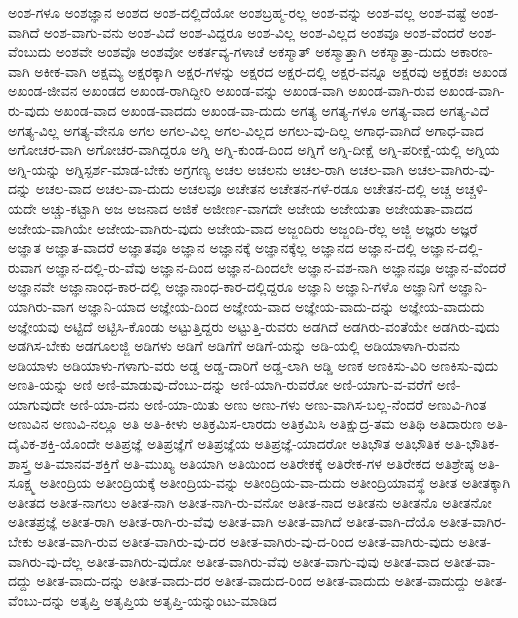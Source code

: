 {ಅಂಶ-ಗಳೂ
ಅಂಶಜ್ಞಾನ
ಅಂಶದ
ಅಂಶ-ದಲ್ಲಿದೆಯೋ
ಅಂಶಬ್ರಹ್ಮ-ರಲ್ಲ
ಅಂಶ-ವನ್ನು
ಅಂಶ-ವಲ್ಲ
ಅಂಶ-ವಷ್ಟೆ
ಅಂಶ-ವಾಗಿದೆ
ಅಂಶ-ವಾಗು-ವನು
ಅಂಶ-ವಿದೆ
ಅಂಶ-ವಿದ್ದರೂ
ಅಂಶ-ವಿಲ್ಲ
ಅಂಶ-ವಿಲ್ಲದ
ಅಂಶವೂ
ಅಂಶ-ವೆಂದರೆ
ಅಂಶ-ವೆಂಬುದು
ಅಂಶವೇ
ಅಂಶವೊ
ಅಂಶವೋ
ಅಕರ್ತವ್ಯ-ಗಳಾಚೆ
ಅಕಸ್ಮಾತ್
ಅಕಸ್ಮಾತ್ತಾಗಿ
ಅಕಸ್ಮಾತ್ತಾ-ದುದು
ಅಕಾರಣ-ವಾಗಿ
ಅಕೀಕ-ವಾಗಿ
ಅಕ್ಷಮ್ಯ
ಅಕ್ಷರಕ್ಕಾಗಿ
ಅಕ್ಷರ-ಗಳನ್ನು
ಅಕ್ಷರದ
ಅಕ್ಷರ-ದಲ್ಲಿ
ಅಕ್ಷರ-ವನ್ನೂ
ಅಕ್ಷರವು
ಅಕ್ಷರಶಃ
ಅಖಂಡ
ಅಖಂಡ-ಜೀವನ
ಅಖಂಡದ
ಅಖಂಡ-ರಾಗಿದ್ದೀರಿ
ಅಖಂಡ-ವನ್ನು
ಅಖಂಡ-ವಾಗಿ
ಅಖಂಡ-ವಾಗಿ-ರುವ
ಅಖಂಡ-ವಾಗಿ-ರು-ವುದು
ಅಖಂಡ-ವಾದ
ಅಖಂಡ-ವಾದದು
ಅಖಂಡ-ವಾ-ದುದು
ಅಗತ್ಯ
ಅಗತ್ಯ-ಗಳೂ
ಅಗತ್ಯ-ವಾದ
ಅಗತ್ಯ-ವಿದೆ
ಅಗತ್ಯ-ವಿಲ್ಲ
ಅಗತ್ಯ-ವೇನೂ
ಅಗಲ
ಅಗಲ-ವಿಲ್ಲ
ಅಗಲ-ವಿಲ್ಲದ
ಅಗಲು-ವು-ದಿಲ್ಲ
ಅಗಾಧ-ವಾಗಿದೆ
ಅಗಾಧ-ವಾದ
ಅಗೋಚರ-ವಾಗಿ
ಅಗೋಚರ-ವಾಗಿದ್ದರೂ
ಅಗ್ನಿ
ಅಗ್ನಿ-ಕುಂಡ-ದಿಂದ
ಅಗ್ನಿಗೆ
ಅಗ್ನಿ-ದೀಕ್ಷೆ
ಅಗ್ನಿ-ಪರೀಕ್ಷೆ-ಯಲ್ಲಿ
ಅಗ್ನಿಯ
ಅಗ್ನಿ-ಯನ್ನು
ಅಗ್ನಿಸ್ಪರ್ಶ-ಮಾಡ-ಬೇಕು
ಅಗ್ರಗಣ್ಯ
ಅಚಲ
ಅಚಲನು
ಅಚಲ-ರಾಗಿ
ಅಚಲ-ವಾಗಿ
ಅಚಲ-ವಾಗಿರು-ವು-ದನ್ನು
ಅಚಲ-ವಾದ
ಅಚಲ-ವಾ-ದುದು
ಅಚಲವೂ
ಅಚೇತನ
ಅಚೇತನ-ಗಳೆ-ರಡೂ
ಅಚೇತನ-ದಲ್ಲಿ
ಅಚ್ಚ
ಅಚ್ಚಳಿ-ಯದೇ
ಅಚ್ಚು-ಕಟ್ಟಾಗಿ
ಅಜ
ಅಜನಾದ
ಅಜಿಕೆ
ಅಜೀರ್ಣ-ವಾಗದೇ
ಅಜೇಯ
ಅಜೇಯತಾ
ಅಜೇಯತಾ-ವಾದದ
ಅಜೇಯ-ವಾಗಿಯೇ
ಅಜೇಯ-ವಾಗಿರು-ವುದು
ಅಜೇಯ-ವಾದ
ಅಜ್ಜಂದಿರು
ಅಜ್ಜಂದಿ-ರೆಲ್ಲ
ಅಜ್ಜಿ
ಅಜ್ಞರು
ಅಜ್ಞರೆ
ಅಜ್ಞಾತ
ಅಜ್ಞಾತ-ವಾದರೆ
ಅಜ್ಞಾತವೂ
ಅಜ್ಞಾನ
ಅಜ್ಞಾನಕ್ಕೆ
ಅಜ್ಞಾನಕ್ಕೆಲ್ಲ
ಅಜ್ಞಾನದ
ಅಜ್ಞಾನ-ದಲ್ಲಿ
ಅಜ್ಞಾನ-ದಲ್ಲಿ-ರುವಾಗ
ಅಜ್ಞಾನ-ದಲ್ಲಿ-ರು-ವೆವು
ಅಜ್ಞಾನ-ದಿಂದ
ಅಜ್ಞಾನ-ದಿಂದಲೇ
ಅಜ್ಞಾನ-ವಶ-ನಾಗಿ
ಅಜ್ಞಾನವೂ
ಅಜ್ಞಾನ-ವೆಂದರೆ
ಅಜ್ಞಾನವೇ
ಅಜ್ಞಾನಾಂಧ-ಕಾರ-ದಲ್ಲಿ
ಅಜ್ಞಾನಾಂಧ-ಕಾರ-ದಲ್ಲಿದ್ದರೂ
ಅಜ್ಞಾನಿ
ಅಜ್ಞಾನಿ-ಗಳೊ
ಅಜ್ಞಾನಿಗೆ
ಅಜ್ಞಾನಿ-ಯಾಗಿರು-ವಾಗ
ಅಜ್ಞಾನಿ-ಯಾದ
ಅಜ್ಞೇಯ-ದಿಂದ
ಅಜ್ಞೇಯ-ವಾದ
ಅಜ್ಞೇಯ-ವಾದು-ದನ್ನು
ಅಜ್ಞೇಯ-ವಾದುದು
ಅಜ್ಞೇಯವು
ಅಟ್ಟಿದೆ
ಅಟ್ಟಿಸಿ-ಕೊಂಡು
ಅಟ್ಟುತ್ತಿದ್ದರು
ಅಟ್ಟುತ್ತಿ-ರುವರು
ಅಡಗಿದೆ
ಅಡಗಿರು-ವಂತೆಯೇ
ಅಡಗಿರು-ವುದು
ಅಡಗಿಸ-ಬೇಕು
ಅಡಗೂಲಜ್ಜಿ
ಅಡಿಗಳು
ಅಡಿಗೆ
ಅಡಿಗೆಗೆ
ಅಡಿಗೆ-ಯನ್ನು
ಅಡಿ-ಯಲ್ಲಿ
ಅಡಿಯಾಳಾಗಿ-ರುವನು
ಅಡಿಯಾಳು
ಅಡಿಯಾಳು-ಗಳಾಗು-ವರು
ಅಡ್ಡ
ಅಡ್ಡ-ದಾರಿಗೆ
ಅಡ್ಡ-ಲಾಗಿ
ಅಡ್ಡಿ
ಅಣಕ
ಅಣಕಿಸು-ವಿರಿ
ಅಣಕಿಸು-ವುದು
ಅಣತಿ-ಯನ್ನು
ಅಣಿ
ಅಣಿ-ಮಾಡುವು-ದೆಂಬು-ದನ್ನು
ಅಣಿ-ಯಾಗಿ-ರುವರೋ
ಅಣಿ-ಯಾಗು-ವ-ವರೆಗೆ
ಅಣಿ-ಯಾಗುವುದೇ
ಅಣಿ-ಯಾ-ದನು
ಅಣಿ-ಯಾ-ಯಿತು
ಅಣು
ಅಣು-ಗಳು
ಅಣು-ವಾಗಿಸ-ಬಲ್ಲ-ನೆಂದರೆ
ಅಣುವಿ-ಗಿಂತ
ಅಣುವಿನ
ಅಣುವಿ-ನಲ್ಲೂ
ಅತಿ
ಅತಿ-ಕೀಳು
ಅತಿಕ್ರಮಿಸ-ಲಾರದು
ಅತಿಕ್ರಮಿಸಿ
ಅತಿಕ್ಷುದ್ರ-ತಮ
ಅತಿಥಿ
ಅತಿದಾರುಣ
ಅತಿ-ದೈವಿಕ-ಶಕ್ತಿ-ಯೊಂದೇ
ಅತಿಪ್ರಜ್ಞೆ
ಅತಿಪ್ರಜ್ಞೆಗೆ
ಅತಿಪ್ರಜ್ಞೆಯ
ಅತಿಪ್ರಜ್ಞೆ-ಯಾದರೋ
ಅತಿಭೌತ
ಅತಿಭೌತಿಕ
ಅತಿ-ಭೌತಿಕ-ಶಾಸ್ತ್ರ
ಅತಿ-ಮಾನವ-ಶಕ್ತಿಗೆ
ಅತಿ-ಮುಖ್ಯ
ಅತಿಯಾಗಿ
ಅತಿಯಿಂದ
ಅತಿರೇಕಕ್ಕೆ
ಅತಿರೇಕ-ಗಳ
ಅತಿರೇಕದ
ಅತಿಶ್ರೇಷ್ಠ
ಅತಿ-ಸೂಕ್ಷ್ಮ
ಅತೀಂದ್ರಿಯ
ಅತೀಂದ್ರಿಯಕ್ಕೆ
ಅತೀಂದ್ರಿಯ-ವನ್ನು
ಅತೀಂದ್ರಿಯ-ವಾ-ದುದು
ಅತೀಂದ್ರಿಯಾವಸ್ಥೆ
ಅತೀತ
ಅತೀತಕ್ಕಾಗಿ
ಅತೀತದ
ಅತೀತ-ನಾಗಲು
ಅತೀತ-ನಾಗಿ
ಅತೀತ-ನಾಗಿ-ರು-ವನೋ
ಅತೀತ-ನಾದ
ಅತೀತನು
ಅತೀತನೊ
ಅತೀತನೋ
ಅತೀತಪ್ರಜ್ಞೆ
ಅತೀತ-ರಾಗಿ
ಅತೀತ-ರಾಗಿ-ರು-ವೆವು
ಅತೀತ-ವಾಗಿ
ಅತೀತ-ವಾಗಿದೆ
ಅತೀತ-ವಾಗಿ-ದೆಯೊ
ಅತೀತ-ವಾಗಿರ-ಬೇಕು
ಅತೀತ-ವಾಗಿ-ರುವ
ಅತೀತ-ವಾಗಿರು-ವು-ದರ
ಅತೀತ-ವಾಗಿರು-ವು-ದ-ರಿಂದ
ಅತೀತ-ವಾಗಿರು-ವುದು
ಅತೀತ-ವಾಗಿರು-ವು-ದೆಲ್ಲ
ಅತೀತ-ವಾಗಿರು-ವುದೋ
ಅತೀತ-ವಾಗಿರು-ವೆವು
ಅತೀತ-ವಾಗು-ವುವು
ಅತೀತ-ವಾದ
ಅತೀತ-ವಾ-ದದ್ದು
ಅತೀತ-ವಾದು-ದನ್ನು
ಅತೀತ-ವಾದು-ದರ
ಅತೀತ-ವಾದುದ-ರಿಂದ
ಅತೀತ-ವಾದುದು
ಅತೀತ-ವಾದುದ್ದು
ಅತೀತ-ವೆಂಬು-ದನ್ನು
ಅತೃಪ್ತಿ
ಅತೃಪ್ತಿಯ
ಅತೃಪ್ತಿ-ಯನ್ನುಂಟು-ಮಾಡಿದ
}
